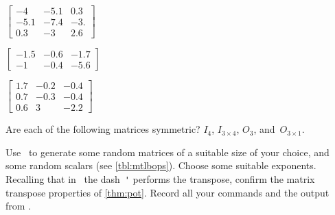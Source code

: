 \begin{exercise}
\begin{parts}
\item \(\begin{bmatrix} -4&-5.1&0.3
\\-5.1&-7.4&-3.
\\0.3&-3&2.6 \end{bmatrix}\)

\item \(\begin{bmatrix} -1.5&-0.6&-1.7
\\-1&-0.4&-5.6 \end{bmatrix}\)

\item \(\begin{bmatrix} 1.7&-0.2&-0.4
\\0.7&-0.3&-0.4
\\0.6&3&-2.2 \end{bmatrix}\)
\end{parts}
\end{exercise}

\begin{exercise} \label{ex:} 
Are each of the following matrices symmetric? 
\(I_4\), \(I_{3\times4}\), \(O_3\), and~\(O_{3\times1}\).
\end{exercise}




\begin{exercise} \label{ex:} 
Use \script\ to generate some random matrices of a suitable size of your choice, and some random scalars (see \autoref{tbl:mtlbops}).
Choose some suitable exponents.
Recalling that in \script\ the dash~\verb|'| performs the transpose, confirm the matrix transpose properties of \autoref{thm:pot}.
Record all your commands and the output from \script.
\end{exercise}


